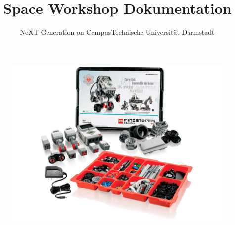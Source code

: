 \documentclass[
	12pt,
	colorbacktitle,
	ngerman,
	accentcolor=1c,%
	type=intern,
	marginpar=false
	]{tudapub}
\begin{document}
\title{Space Workshop \newline Dokumentation}
\subtitle{\bigskip NeXT Generation on Campus\newline \normalfont \normalsize Technische Universit\"at Darmstadt}

\date{} %

\maketitle

\bigskip
\bigskip
\bigskip
\bigskip
\bigskip
\bigskip
\begin{figure}[h]
	\centering 
	\includegraphics[width=\textwidth]{images/title.jpg}
\end{figure}

\newpage

		





{}
{}


\end{document}
